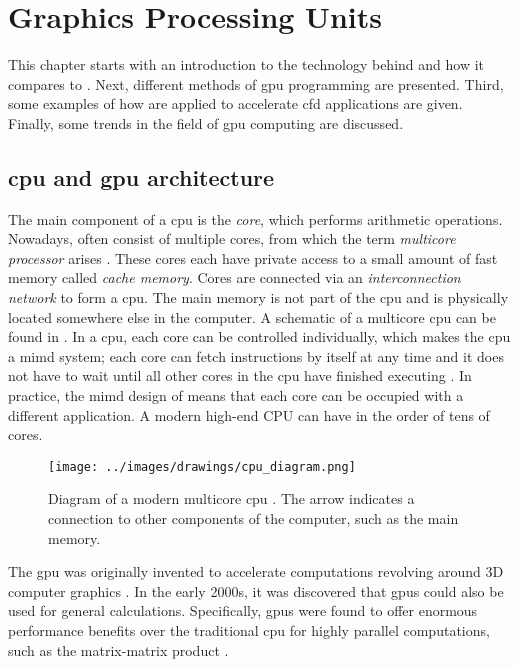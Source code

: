 \chapter{Graphics Processing Units} \label{chap:gpgpu}
This chapter starts with an introduction to the technology behind  and how it compares to . Next, different methods of \acrshort{gpu} programming are presented. Third, some examples of how  are applied to accelerate \acrshort{cfd} applications are given. Finally, some trends in the field of \acrshort{gpu} computing are discussed. 


\section{\acrshort{cpu} and \acrshort{gpu} architecture}
The main component of a \acrshort{cpu} is the \emph{core}, which performs arithmetic operations. Nowadays,  often consist of multiple cores, from which the term \emph{multicore processor} arises \citep{rauberParallelProgrammingMulticore2023}. These cores each have private access to a small amount of fast memory called \emph{cache memory}. Cores are connected via an \emph{interconnection network} to form a \acrshort{cpu}. The main memory is not part of the \acrshort{cpu} and is physically located somewhere else in the computer. A schematic of a multicore \acrshort{cpu} can be found in . In a \acrshort{cpu}, each core can be controlled individually, which makes the \acrshort{cpu} a \acrfull{mimd} system; each core can fetch instructions by itself at any time and it does not have to wait until all other cores in the \acrshort{cpu} have finished executing \citep{flynnVeryHighspeedComputing1966}. In practice, the \acrshort{mimd} design of  means that each core can be occupied with a different application. A modern high-end CPU can have in the order of tens of cores.

\begin{figure}
    \centering
    \texttt{[image: ../images/drawings/cpu\_diagram.png]}
    \caption{Diagram of a modern multicore \acrshort{cpu} \citep{rauberParallelProgrammingMulticore2023}. The arrow indicates a connection to other components of the computer, such as the main memory.}
    \label{fig:cpu_diagram}
\end{figure}

The \acrshort{gpu} was originally invented to accelerate computations revolving around 3D computer graphics \citep{aamondtGeneralPurposeGraphicsProcessing2018}. In the early 2000s, it was discovered that \acrshort{gpu}s could also be used for general calculations. Specifically, \acrshort{gpu}s were found to offer enormous performance benefits over the traditional \acrshort{cpu} for highly parallel computations, such as the matrix-matrix product \citep{larsenFastMatrixMultiplies2001}. 

